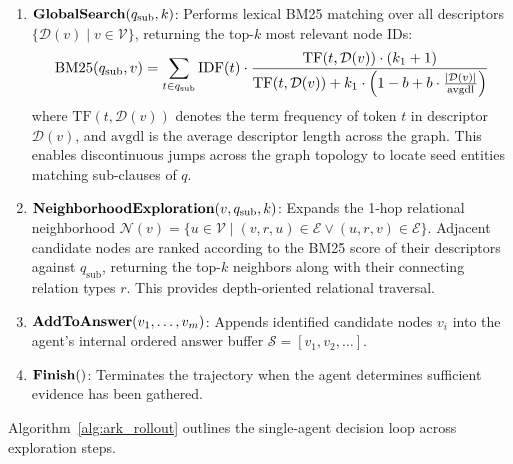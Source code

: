 \documentclass[11pt]{article}
\begin{document}
\begin{enumerate}[leftmargin=*]
    \item $\text{\textbf{GlobalSearch}}(q_{\text{sub}}, k)$: Performs lexical BM25 matching \citep{robertson2009bm25} over all descriptors $\{\mathcal{D}(v) \mid v \in \mathcal{V}\}$, returning the top-$k$ most relevant node IDs:
    \begin{equation}
    \label{eq:bm25}
    \resizebox{0.90\columnwidth}{!}{$
    \displaystyle \text{BM25}(q_{\text{sub}}, v) = \sum_{t \in q_{\text{sub}}} \text{IDF}(t) \cdot \frac{\text{TF}(t, \mathcal{D}(v)) \cdot (k_1 + 1)}{\text{TF}(t, \mathcal{D}(v)) + k_1 \cdot \left(1 - b + b \cdot \frac{|\mathcal{D}(v)|}{\text{avgdl}}\right)}
    $}
    \end{equation}
    where $\text{TF}(t, \mathcal{D}(v))$ denotes the term frequency of token $t$ in descriptor $\mathcal{D}(v)$, and $\text{avgdl}$ is the average descriptor length across the graph. This enables discontinuous jumps across the graph topology to locate seed entities matching sub-clauses of $q$.

    \item $\text{\textbf{NeighborhoodExploration}}(v, q_{\text{sub}}, k)$: Expands the 1-hop relational neighborhood $\mathcal{N}(v) = \{u \in \mathcal{V} \mid (v, r, u) \in \mathcal{E} \lor (u, r, v) \in \mathcal{E}\}$. Adjacent candidate nodes are ranked according to the BM25 score of their descriptors against $q_{\text{sub}}$, returning the top-$k$ neighbors along with their connecting relation types $r$. This provides depth-oriented relational traversal.

    \item $\text{\textbf{AddToAnswer}}(v_1, \dots, v_m)$: Appends identified candidate nodes $v_i$ into the agent's internal ordered answer buffer $\mathcal{S} = [v_1, v_2, \dots]$.

    \item $\text{\textbf{Finish}}()$: Terminates the trajectory when the agent determines sufficient evidence has been gathered.
\end{enumerate}

Algorithm~\ref{alg:ark_rollout} outlines the single-agent decision loop across exploration steps.
\end{document}
